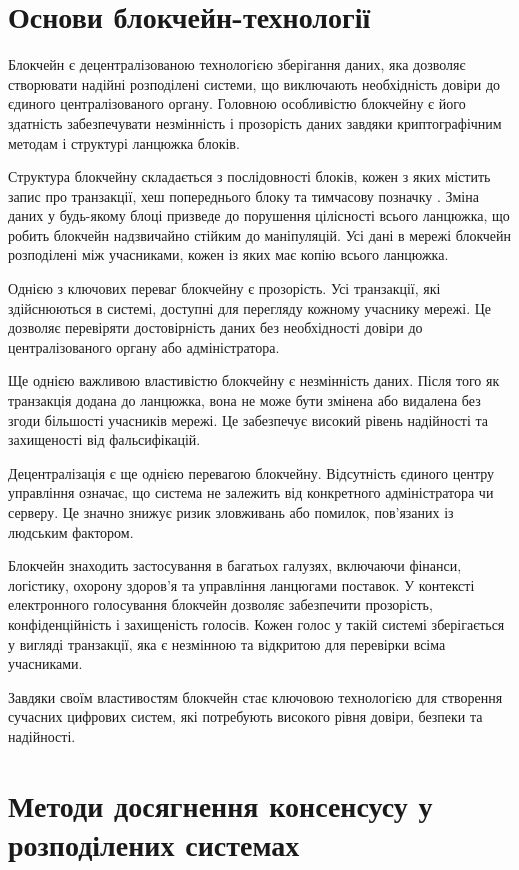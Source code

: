 \documentclass[14pt]{extreport}
\begin{document}
  \section{Основи блокчейн-технології}

  Блокчейн є децентралізованою технологією зберігання даних, яка дозволяє створювати надійні розподілені системи, що виключають необхідність довіри до єдиного централізованого органу. Головною особливістю блокчейну є його здатність забезпечувати незмінність і прозорість даних завдяки криптографічним методам і структурі ланцюжка блоків.

  Структура блокчейну складається з послідовності блоків, кожен з яких містить запис про транзакції, хеш попереднього блоку та тимчасову позначку \cite{blockchain}. Зміна даних у будь-якому блоці призведе до порушення цілісності всього ланцюжка, що робить блокчейн надзвичайно стійким до маніпуляцій. Усі дані в мережі блокчейн розподілені між учасниками, кожен із яких має копію всього ланцюжка.

  Однією з ключових переваг блокчейну є прозорість. Усі транзакції, які здійснюються в системі, доступні для перегляду кожному учаснику мережі. Це дозволяє перевіряти достовірність даних без необхідності довіри до централізованого органу або адміністратора.

  Ще однією важливою властивістю блокчейну є незмінність даних. Після того як транзакція додана до ланцюжка, вона не може бути змінена або видалена без згоди більшості учасників мережі. Це забезпечує високий рівень надійності та захищеності від фальсифікацій.

  Децентралізація є ще однією перевагою блокчейну. Відсутність єдиного центру управління означає, що система не залежить від конкретного адміністратора чи серверу. Це значно знижує ризик зловживань або помилок, пов’язаних із людським фактором.

  Блокчейн знаходить застосування в багатьох галузях, включаючи фінанси, логістику, охорону здоров’я та управління ланцюгами поставок. У контексті електронного голосування блокчейн дозволяє забезпечити прозорість, конфіденційність і захищеність голосів. Кожен голос у такій системі зберігається у вигляді транзакції, яка є незмінною та відкритою для перевірки всіма учасниками.

  Завдяки своїм властивостям блокчейн стає ключовою технологією для створення сучасних цифрових систем, які потребують високого рівня довіри, безпеки та надійності.

  \section{Методи досягнення консенсусу у розподілених системах}
\end{document}
